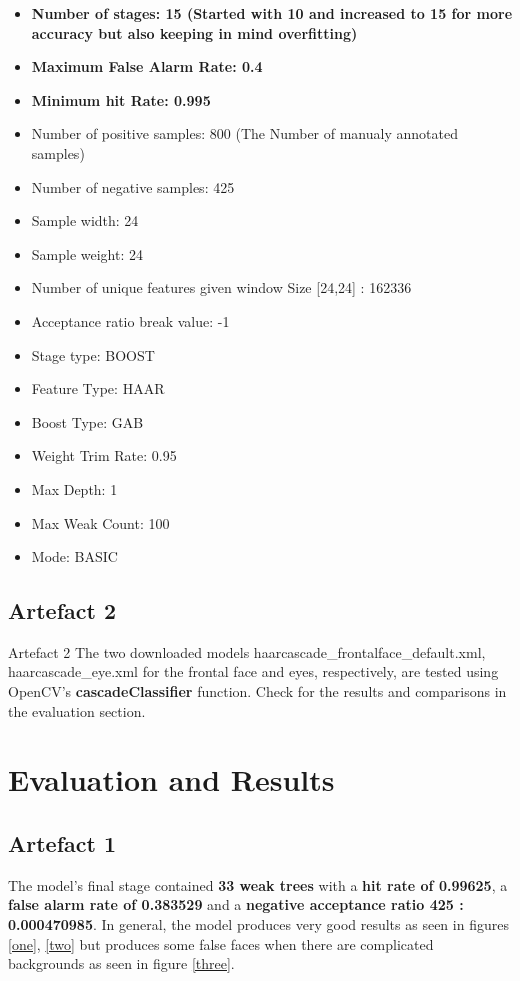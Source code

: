     \begin{itemize}
        \item \textbf{Number of stages: 15  (Started with 10 and
        increased to 15 for more accuracy but also keeping in mind
        overfitting)}
        \item \textbf{Maximum False Alarm Rate: 0.4}
        \item \textbf{Minimum hit Rate: 0.995}
        \item Number of positive samples: 800 (The Number of manualy annotated samples)
        \item Number of negative samples: 425
        \item Sample width: 24
        \item Sample weight: 24
        \item Number of unique features given window Size [24,24] : 162336
        \item Acceptance ratio break value: -1
        \item Stage type: BOOST
        \item Feature Type: HAAR
        \item Boost Type: GAB
        \item Weight Trim Rate: 0.95
        \item Max Depth: 1
        \item Max Weak Count: 100
        \item Mode: BASIC
    \end{itemize}


\subsection{Artefact 2}

    Artefact 2 The two downloaded models
    haarcascade\_frontalface\_default.xml, haarcascade\_eye.xml for
    the frontal face and eyes, respectively,  are tested using
    OpenCV's \textbf{cascadeClassifier} function. Check for the
    results and comparisons in the evaluation section.

\section{Evaluation and Results}

    \subsection{Artefact 1}
        The model's final stage contained \textbf{33 weak trees} with
        a \textbf{hit rate of 0.99625}, a \textbf{false alarm rate of
        0.383529} and a \textbf{negative acceptance ratio 425 :
        0.000470985}. In general, the model produces very good results
        as seen in figures \ref{one}, \ref{two} but produces some
        false faces when there are complicated backgrounds as seen in
        figure \ref{three}.

